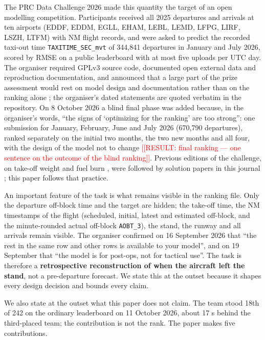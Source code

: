 \documentclass[11pt,a4paper]{article}
\newcommand{\placeholder}[1]{\textcolor{red}{[[RESULT:#1]]}}
\begin{document}
The PRC Data Challenge 2026 \autocite{prc2026site} made this quantity the target of an open modelling competition. Participants received all 2025 departures and arrivals at ten airports (EDDF, EDDM, EGLL, EHAM, LEBL, LEMD, LFPG, LIRF, LSZH, LTFM) with NM flight records, and were asked to predict the recorded taxi-out time \texttt{TAXITIME\_\allowbreak{}SEC\_\allowbreak{}mvt} of 344,841 departures in January and July 2026, scored by RMSE on a public leaderboard with at most five uploads per UTC day. The organiser required GPLv3 source code, documented open external data and reproduction documentation, and announced that a large part of the prize assessment would rest on model design and documentation rather than on the ranking alone \autocite{prc2026site}; the organiser's dated statements are quoted verbatim in the repository. On 8 October 2026 a blind final phase was added because, in the organiser's words, ``the signs of `optimizing for the ranking' are too strong'': one submission for January, February, June and July 2026 (670,790 departures), ranked separately on the initial two months, the two new months and all four, with the design of the model not to change \placeholder{ final ranking --- one sentence on the outcome of the blind ranking}. Previous editions of the challenge, on take-off weight \autocite{spinielli2025atow} and fuel burn \autocite{sun2026fuel}, were followed by solution papers in this journal \autocite{murca2025atow,grigoriou2026fuel,kacar2026fuel}; this paper follows that practice.

An important feature of the task is what remains visible in the ranking file. Only the departure off-block time and the target are hidden; the take-off time, the NM timestamps of the flight (scheduled, initial, latest and estimated off-block, and the minute-rounded actual off-block \texttt{AOBT\_\allowbreak{}3}), the stand, the runway and all arrivals remain visible. The organiser confirmed on 16 September 2026 that ``the rest in the same row and other rows is available to your model'', and on 19 September that ``the model is for post-ops, not for tactical use''. The task is therefore a \textbf{retrospective reconstruction of when the aircraft left the stand}, not a pre-departure forecast. We state this at the outset because it shapes every design decision and bounds every claim.

We also state at the outset what this paper does not claim. The team stood 18th of 242 on the ordinary leaderboard on 11 October 2026, about 17 s behind the third-placed team; the contribution is not the rank. The paper makes five contributions.
\end{document}
